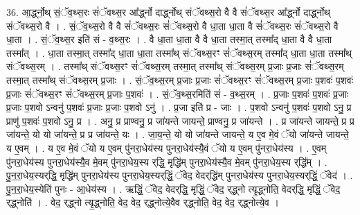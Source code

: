 \documentclass[17pt]{extarticle}
\begin{document}
36. आ॒र्द्ध्नो॒थ् सं॒ॅव॒थ्स॒रः सं॑ॅवथ्स॒र आ᳚र्द्ध्नो दार्द्ध्नोथ् संॅवथ्स॒रो वै वै सं॑ॅवथ्स॒र आ᳚र्द्ध्नो दार्द्ध्नोथ् संॅवथ्स॒रो वै । . सं॒ॅव॒थ्स॒रो वै वै सं॑ॅवथ्स॒रः सं॑ॅवथ्स॒रो वै धा॒ता धा॒ता वै सं॑ॅवथ्स॒रः सं॑ॅवथ्स॒रो वै धा॒ता । . सं॒ॅव॒थ्स॒र इति॑ सं - व॒थ्स॒रः । . वै धा॒ता धा॒ता वै वै धा॒ता तस्मा॒त् तस्मा᳚द् धा॒ता वै वै धा॒ता तस्मा᳚त् । . धा॒ता तस्मा॒त् तस्मा᳚द् धा॒ता धा॒ता तस्मा᳚थ् संॅवथ्स॒रꣳ सं॑ॅवथ्स॒रम् तस्मा᳚द् धा॒ता धा॒ता तस्मा᳚थ् संॅवथ्स॒रम् । . तस्मा᳚थ् संॅवथ्स॒रꣳ सं॑ॅवथ्स॒रम् तस्मा॒त् तस्मा᳚थ् संॅवथ्स॒रम् प्र॒जाः प्र॒जाः सं॑ॅवथ्स॒रम् तस्मा॒त् तस्मा᳚थ् संॅवथ्स॒रम् प्र॒जाः । . सं॒ॅव॒थ्स॒रम् प्र॒जाः प्र॒जाः सं॑ॅवथ्स॒रꣳ सं॑ॅवथ्स॒रम् प्र॒जाः प॒शवः॑ प॒शवः॑ प्र॒जाः सं॑ॅवथ्स॒रꣳ सं॑ॅवथ्स॒रम् प्र॒जाः प॒शवः॑ । . सं॒ॅव॒थ्स॒रमिति॑ सं - व॒थ्स॒रम् । . प्र॒जाः प॒शवः॑ प॒शवः॑ प्र॒जाः प्र॒जाः प॒शवो ऽन्वनु॑ प॒शवः॑ प्र॒जाः प्र॒जाः प॒शवो ऽनु॑ । . प्र॒जा इति॑ प्र - जाः । . प॒शवो ऽन्वनु॑ प॒शवः॑ प॒शवो ऽनु॒ प्र प्राणु॑ प॒शवः॑ प॒शवो ऽनु॒ प्र । . अनु॒ प्र प्राण्वनु॒ प्र जा॑यन्ते जायन्ते॒ प्राण्वनु॒ प्र जा॑यन्ते । . प्र जा॑यन्ते जायन्ते॒ प्र प्र जा॑यन्ते॒ यो यो जा॑यन्ते॒ प्र प्र जा॑यन्ते॒ यः । . जा॒य॒न्ते॒ यो यो जा॑यन्ते जायन्ते॒ य ए॒व मे॒वं ॅयो जा॑यन्ते जायन्ते॒ य ए॒वम् । . य ए॒व मे॒वं ॅयो य ए॒वम् पु॑नरा॒धेय॑स्य पुनरा॒धेय॑स्यै॒वं ॅयो य ए॒वम् पु॑नरा॒धेय॑स्य । . ए॒वम् पु॑नरा॒धेय॑स्य पुनरा॒धेय॑स्यै॒व मे॒वम् पु॑नरा॒धेय॒स्य र्‌द्धि॒ मृद्धि॑म् पुनरा॒धेय॑स्यै॒व मे॒वम् पु॑नरा॒धेय॒स्य र्‌द्धि᳚म् । . पु॒न॒रा॒धेय॒स्यर्‌द्धि॒ मृद्धि॑म् पुनरा॒धेय॑स्य पुनरा॒धेय॒स्यर्‌द्धिं॒ ॅवेद॒ वेदर्‌द्धि॑म् पुनरा॒धेय॑स्य पुनरा॒धेय॒स्यर्‌द्धिं॒ ॅवेद॑ । . पु॒न॒रा॒धेय॒स्येति॑ पुनः - आ॒धेय॑स्य । . ऋद्धिं॒ ॅवेद॒ वेदर्‌द्धि॒ मृद्धिं॒ ॅवेद॒ र्‌द्ध्नो त्यृ॒द्ध्नोति॒ वेदर्‌द्धि॒ मृद्धिं॒ ॅवेद॒ र्‌द्ध्नोति॑ । . वेद॒ र्‌द्ध्नो त्यृ॒द्ध्नोति॒ वेद॒ वेद॒ र्‌द्ध्नोत्ये॒वैव र्‌द्ध्नोति॒ वेद॒ वेद॒ र्‌द्ध्नोत्ये॒व । \newline
\pagebreak
{}
\end{document}
